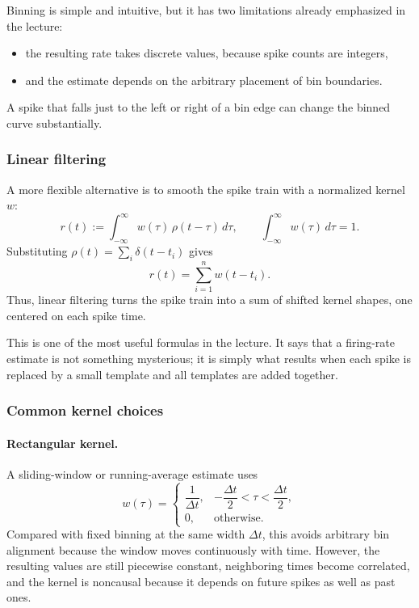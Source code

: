 \documentclass[11pt]{article}
\begin{document}
Binning is simple and intuitive, but it has two limitations already emphasized in the lecture:
\begin{itemize}
    \item the resulting rate takes discrete values, because spike counts are integers,
    \item and the estimate depends on the arbitrary placement of bin boundaries.
\end{itemize}
A spike that falls just to the left or right of a bin edge can change the binned curve substantially.

\subsubsection{Linear filtering}

A more flexible alternative is to smooth the spike train with a normalized kernel $w$:
\[
r(t) := \int_{-\infty}^{\infty} w(\tau)\,\rho(t-\tau)\,d\tau,
\qquad
\int_{-\infty}^{\infty} w(\tau)\,d\tau = 1.
\]
Substituting $\rho(t)=\sum_i \delta(t-t_i)$ gives
\[
r(t)=\sum_{i=1}^{n} w(t-t_i).
\]
Thus, linear filtering turns the spike train into a sum of shifted kernel shapes, one centered on each spike time.

This is one of the most useful formulas in the lecture. It says that a firing-rate estimate is not something mysterious; it is simply what results when each spike is replaced by a small template and all templates are added together.

\subsubsection{Common kernel choices}

\paragraph{Rectangular kernel.}
A sliding-window or running-average estimate uses
\[
w(\tau)=
\begin{cases}
\dfrac{1}{\Delta t}, & -\dfrac{\Delta t}{2} < \tau < \dfrac{\Delta t}{2},\\[6pt]
0, & \text{otherwise.}
\end{cases}
\]
Compared with fixed binning at the same width $\Delta t$, this avoids arbitrary bin alignment because the window moves continuously with time. However, the resulting values are still piecewise constant, neighboring times become correlated, and the kernel is noncausal because it depends on future spikes as well as past ones.
\end{document}
